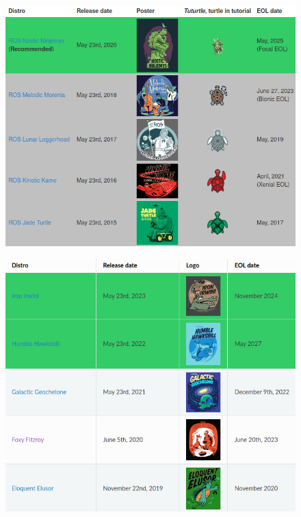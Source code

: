 \documentclass[titlepage,draft]{article}
\begin{document}
{\begin{figure}[H]
	\centering
	\begin{minipage}{.45\textwidth}
		\centering
		\includegraphics[width=\linewidth]{ROS1Distros.png}
		\label{fig:ros1distros}
	\end{minipage}%
	\hspace{0.1\textwidth}%
	\begin{minipage}{.45\textwidth}
		\centering
		\includegraphics[width=\linewidth]{ROS2Distros.png}
		\label{fig:ros2distros}
	\end{minipage}
\end{figure}

}
\end{document}
